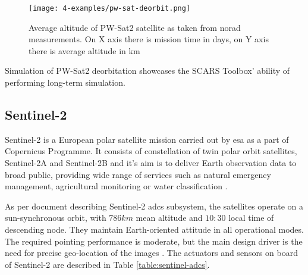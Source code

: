             \begin{figure}[H]
                \centering
                \texttt{[image: 4-examples/pw-sat-deorbit.png]}
                \caption{Average altitude of PW-Sat2 satellite as taken from \ac{norad} measurements. On X axis there is mission time in days, on Y axis there is average altitude in km\cite{pw_sat2_deorbit}}
                \label{fig:pw-sat-deorbit}
            \end{figure}

            Simulation of PW-Sat2 deorbitation showcases the SCARS Toolbox' ability of performing long-term simulation.
            









    \subsection{Sentinel-2}\label{sec:sentinel}
    
        Sentinel-2 is a European polar satellite mission carried out by \ac{esa} as a part of Copernicus Programme. It consists of constellation of twin polar orbit satellites, Sentinel-2A and Sentinel-2B and it's aim is to deliver Earth observation data to broad public, providing wide range of services such as natural emergency management, agricultural monitoring or water classification  \cite{sentinelreference_description}.

        As per document describing Sentinel-2 \ac{adcs} subsystem, the satellites operate on a sun-synchronous orbit, with $786km$ mean altitude and $10:30$ local time of descending node. They maintain Earth-oriented attitude in all operational modes. The required pointing performance is moderate, but the main design driver is the need for precise geo-location of the images \cite{sentinelreference_adcs}. The actuators and sensors on board of Sentinel-2 are described in Table \ref{table:sentinel-adcs}.

